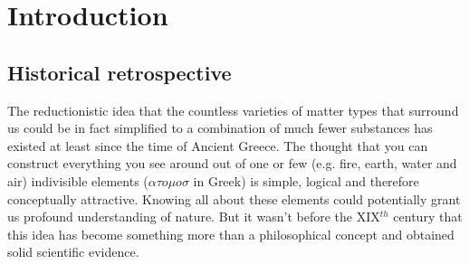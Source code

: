 \section{Introduction}

\subsection{Historical retrospective}
    The reductionistic idea that the countless varieties of matter types that surround us could be in fact simplified to a combination of much fewer substances has existed at least since the time of Ancient Greece. The thought that you can construct everything you see around out of one or few (e.g. fire, earth, water and air) indivisible elements ($\alpha \tau o \mu o \sigma$ in Greek) is simple, logical and therefore conceptually attractive. Knowing all about these elements could potentially grant us profound understanding of nature. But it wasn't before the XIX$^{th}$ century that this idea has become something more than a philosophical concept and obtained solid scientific evidence. \\

